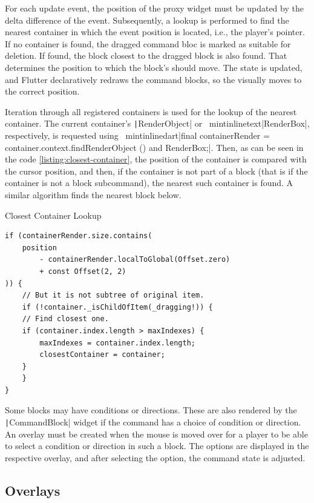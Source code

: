 For each update event, the position of the proxy widget must be updated by the delta difference of the event.
Subsequently, a lookup is performed to find the nearest container in which the event position is located, i.e., the player's pointer.
If no container is found, the dragged command bloc is marked as suitable for deletion.
If found, the block closest to the dragged block is also found.
That determines the position to which the block's  should move.
The state is updated, and Flutter declaratively redraws the command blocks, so the  visually moves to the correct position.

Iteration through all registered containers is used for the lookup of the nearest container.
The current container's \texttt|RenderObject| or \ mintinline{text}|RenderBox|, respectively, is requested using \ mintinline{dart}|final containerRender = container.context.findRenderObject () and RenderBox;|.
Then, as can be seen in the code \ref{listing:closest-container}, the position of the container is compared with the cursor position, and then, if the container is not part of a block (that is if the container is not a block subcommand), the nearest such container is found.
A similar algorithm finds the nearest block below.

\begin{listing}
    \caption{Closest Container Lookup}
    \label{listing:closest-container}
    \begin{verbatim}
if (containerRender.size.contains(
    position 
        - containerRender.localToGlobal(Offset.zero) 
        + const Offset(2, 2)
)) {
    // But it is not subtree of original item.
    if (!container._isChildOfItem(_dragging!)) {
    // Find closest one.
    if (container.index.length > maxIndexes) {
        maxIndexes = container.index.length;
        closestContainer = container;
    }
    }
}
    \end{verbatim}
\end{listing}

Some blocks may have conditions or directions.
These are also rendered by the \texttt|CommandBlock| widget if the command has a choice of condition or direction.
An overlay must be created when the mouse is moved over for a player to be able to select a condition or direction in such a block.
The options are displayed in the respective overlay, and after selecting the option, the command state is adjusted.

\subsection{Overlays}

